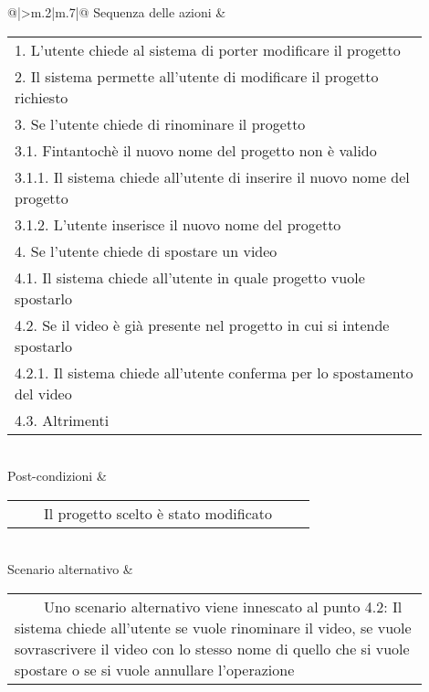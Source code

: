 \begin{longtable}{@{}|>{\centering\arraybackslash}m{.2\textwidth}|m{.7\textwidth}|@{}}
		Sequenza delle azioni & \begin{tabular}{m{0.9\linewidth}}\hspace{0.0cm}1. L'utente chiede al sistema di porter modificare il progetto\\\hspace{0.0cm}2. Il sistema permette all'utente di modificare il progetto richiesto\\\hspace{0.0cm}3. Se l'utente chiede di rinominare il progetto\\\hspace{0.5cm}\hspace{0.0cm}3.1. Fintantochè il nuovo nome del progetto non è valido\\\hspace{1.0cm}\hspace{0.5cm}\hspace{0.0cm}3.1.1. Il sistema chiede all'utente di inserire il nuovo nome del progetto\\\hspace{1.0cm}\hspace{0.5cm}\hspace{0.0cm}3.1.2. L'utente inserisce il nuovo nome del progetto\\\hspace{0.0cm}4. Se l'utente chiede di spostare un video\\\hspace{0.5cm}\hspace{0.0cm}4.1. Il sistema chiede all'utente in quale progetto vuole spostarlo\\\hspace{0.5cm}\hspace{0.0cm}4.2. Se il video è già presente nel progetto in cui si intende spostarlo\\\hspace{1.0cm}\hspace{0.5cm}\hspace{0.0cm}4.2.1. Il sistema chiede all'utente conferma per lo spostamento del video\\\hspace{0.5cm}\hspace{0.0cm}4.3. Altrimenti\\\end{tabular}\\
		Post-condizioni & \begin{tabular}{m{0.9\linewidth}}~~\llap{\textbullet}~~Il progetto scelto è stato modificato\\\end{tabular}\\
		Scenario alternativo & \begin{tabular}{m{0.9\linewidth}}~~\llap{\textbullet}~~Uno scenario alternativo viene innescato al punto 4.2: Il sistema chiede all'utente se vuole rinominare il video, se vuole sovrascrivere il video con lo stesso nome di quello che si vuole spostare o se si vuole annullare l'operazione\\\end{tabular}\\\hline
		
	\end{longtable}
